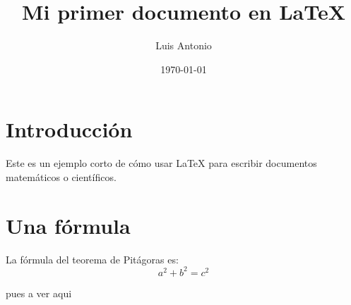 \documentclass{article}
\title{Mi primer documento en \LaTeX}
\author{Luis Antonio}
\date{\today}
\begin{document}
\maketitle

\section{Introducción}
Este es un ejemplo corto de cómo usar \LaTeX{} para escribir documentos matemáticos o científicos.

\section{Una fórmula}
La fórmula del teorema de Pitágoras es:
\[
a^2 + b^2 = c^2
\]

pues a ver aqui
\end{document}
